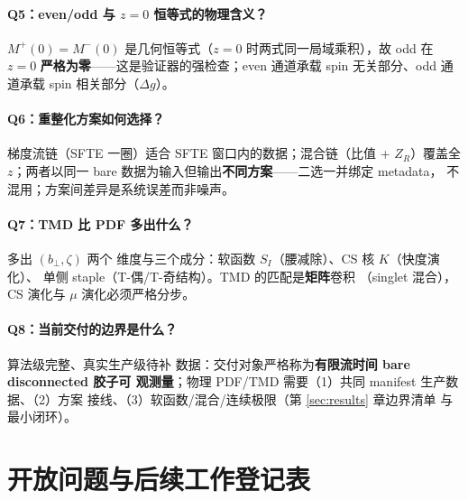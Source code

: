 \documentclass[11pt,a4paper]{ctexart}
\newcommand{\bperp}{b_{\perp}}
\begin{document}
\paragraph{Q5：even/odd 与 $z=0$ 恒等式的物理含义？}$M^{+}(0)
=M^{-}(0)$ 是几何恒等式（$z=0$ 时两式同一局域乘积），故 odd 在
$z=0$ \textbf{严格为零}——这是验证器的强检查；even 通道承载
spin 无关部分、odd 通道承载 spin 相关部分（$\Delta g$）。

\paragraph{Q6：重整化方案如何选择？}梯度流链（SFTE 一圈）适合
SFTE 窗口内的数据；混合链（比值 + $Z_R$）覆盖全 $z$；两者以同一
bare 数据为输入但输出\textbf{不同方案}——二选一并绑定 metadata，
不混用；方案间差异是系统误差而非噪声。

\paragraph{Q7：TMD 比 PDF 多出什么？}多出 $(\bperp,\zeta)$ 两个
维度与三个成分：软函数 $S_I$（腰减除）、CS 核 $K$（快度演化）、
单侧 staple（T-偶/T-奇结构）。TMD 的匹配是\textbf{矩阵}卷积
（singlet 混合），CS 演化与 $\mu$ 演化必须严格分步。

\paragraph{Q8：当前交付的边界是什么？}算法级完整、真实生产级待补
数据：交付对象严格称为\textbf{有限流时间 bare disconnected 胶子可
观测量}；物理 PDF/TMD 需要（1）共同 manifest 生产数据、（2）方案
接线、（3）软函数/混合/连续极限（第 \ref{sec:results} 章边界清单
与最小闭环）。

\section{开放问题与后续工作登记表}
\label{sec:open-problems}
\end{document}
